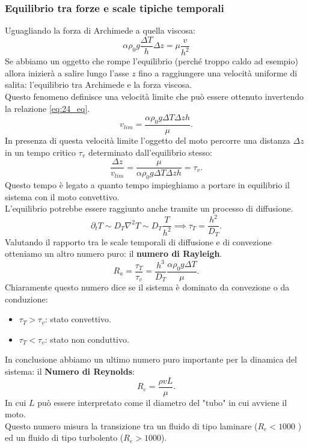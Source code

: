 \subsubsection{Equilibrio tra forze e scale tipiche temporali}%
\label{subsub:Equilibrio tra forze}
Uguagliando la forza di Archimede a quella viscosa:
\begin{equation}
    \alpha\rho_0g \frac{\Delta T}{h} \Delta z = \mu  \frac{v}{h^2}
    \label{eq:24_eq}
\end{equation}
Se abbiamo un oggetto che rompe l'equilibrio (perché troppo caldo ad esempio) allora inizierà a salire lungo l'asse $z$ fino a raggiungere una velocità uniforme di salita: l'equilibrio tra Archimede e la forza viscosa.\\
Questo fenomeno definisce una velocità limite che può essere ottenuto invertendo la relazione \ref{eq:24_eq}.
\[
    v_{lim} = \frac{\alpha\rho_0g\Delta T\Delta zh}{\mu}
.\] 
In presenza di questa velocità limite l'oggetto del moto percorre una distanza $\Delta z$ in un tempo critico $\tau_{v}$  determinato dall'equilibrio stesso:
\[
    \frac{\Delta z}{v_{lim}} = \frac{\mu}{\alpha\rho_0g\Delta T\Delta zh} = \tau_{v}
.\] 
Questo tempo è legato a quanto tempo impieghiamo a portare in equilibrio il sistema con il moto convettivo.\\
L'equilibrio potrebbe essere raggiunto anche tramite un processo di diffusione.
\[
    \partial_{t}T\sim D_T\nabla ^2T \sim D_T \frac{T}{h^2} \implies  \tau_{T} = \frac{h^2}{D_T}
.\] 
Valutando il rapporto tra le scale temporali di diffusione e di convezione otteniamo un altro numero puro: il \textbf{numero di Rayleigh}.
\[
    R_a = \frac{\tau_T}{\tau_v} = \frac{h^3}{D_T} \frac{\alpha\rho_0g \Delta T}{\mu}
.\] 
Chiaramente questo numero dice se il sistema è dominato da convezione o da conduzione:
\begin{itemize}
    \item $\tau_T > \tau_v$: stato convettivo.
    \item $\tau_T < \tau_v$: stato non conduttivo.
\end{itemize}
In conclusione abbiamo un ultimo numero puro importante per la dinamica del sistema: il \textbf{Numero di Reynolds}:
\[
    R_e = \frac{\rho vL}{\mu}	
.\] 
In cui $L$ può essere interpretato come il diametro del "tubo" in cui avviene il moto.\\
Questo numero misura la transizione tra un fluido di tipo laminare ($R_e < 1000$ ) ed un fluido di tipo turbolento ($R_e > 1000$).
